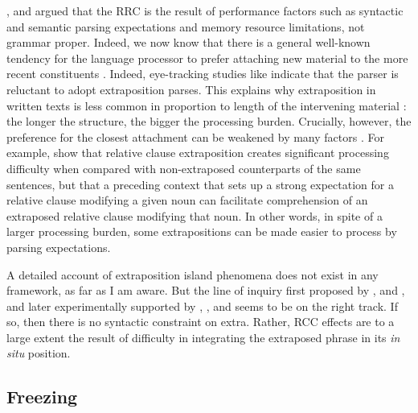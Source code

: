 \documentclass[output=paper
                ,modfonts
                ,nonflat
	        ,collection
	        ,collectionchapter
	        ,collectiontoclongg
 	        ,biblatex
                ,babelshorthands
                ,newtxmath
                ,draftmode
                ,colorlinks, citecolor=brown
]{./langsci/langscibook}
\begin{document}


\zl


 \citet{grosurrc},  \citet{gazdar} and \citet{stucky} argued that the RRC is the result of
  performance  factors such as  syntactic and semantic parsing expectations and  memory resource  limitations,  not grammar proper.   Indeed, we now know that  there is a general well-known  tendency for the language processor to  prefer attaching new material
 to the more recent constituents  \citep{frazcl,gibetal,trax98,fodor02b,fernandez03}. 
Indeed, eye-tracking studies like \citet{hnps}  indicate that the
parser is reluctant to adopt  extraposition  parses.
This  explains why     extraposition in written texts
is less common in proportion to length of  the  intervening material \citep{UBDKKOS98b}:
the longer the structure, the bigger the processing burden. 
 Crucially, however, the preference for the closest attachment can be weakened by
many factors \citep{fernandez03,desmet,devic,carreras}. 
For example,  \citet{levyted}  show that relative clause extraposition creates
 significant processing difficulty when compared with  non-extraposed counterparts of 
 the same sentences,   but that a preceding context that sets up a strong expectation
for a relative clause modifying a given noun can  facilitate
comprehension of an extraposed relative clause modifying that noun.
In other words, in spite of a larger processing burden,
some extrapositions can be made easier to process by parsing expectations.

A detailed account of extraposition island phenomena  does not exist in any framework, as far as I
am aware. But the line of inquiry first proposed by  \citet{grosurrc},  \citet{gazdar} and \citet{stucky},  and later experimentally supported by \citet{levyted}, \citet{strunk08}, and \citet{strunk} seems to be on the right track. If so, then there is no syntactic constraint on {\sc extra}. Rather, RCC effects are to a large extent the result of difficulty in integrating the extraposed phrase in its  \emph{in situ} position.  

\subsection{Freezing}
\end{document}

